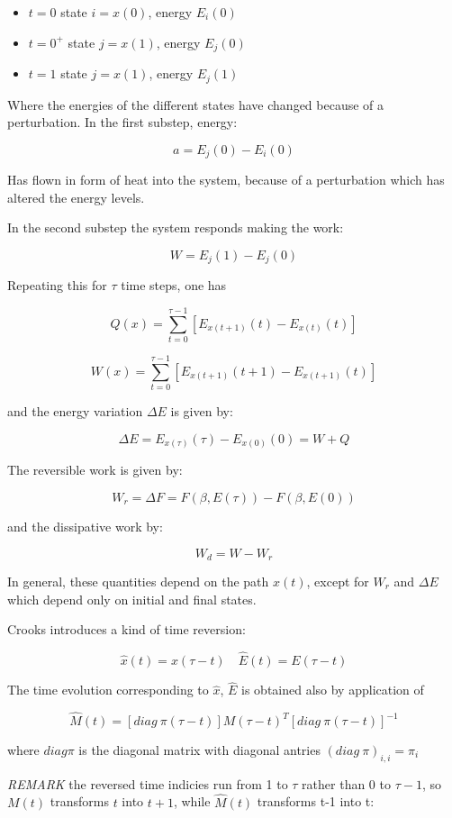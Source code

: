 \documentclass{article}
\begin{document}
\begin{itemize}
	\item $t=0$ state $i=x(0)$, energy $E_i(0)$
	\item $t=0^+$ state $j=x(1)$, energy $E_j(0)$
	\item $t=1$ state $j=x(1)$, energy $E_j(1)$
\end{itemize}

Where the energies of the different states have changed because of a perturbation.
In the first substep, energy: 

$$ a = E_j(0)-E_i(0)$$

Has flown in form of heat into the system, because of a perturbation which has altered the energy levels.

In the second substep the system responds making the work:

$$ W = E_j(1) - E_j(0)$$

Repeating this for $\tau$ time steps, one has

$$Q(x) = \sum_{t=0}^{\tau -1}[E_{x(t+1)}(t) - E_{x(t)}(t)]$$

$$W(x) = \sum_{t=0}^{\tau -1}[E_{x(t+1)}(t+1) - E_{x(t+1)}(t)]$$

and the energy variation $\Delta E$ is given by:

$$\Delta E = E_{x(\tau)}(\tau) - E_{x(0)}(0) = W + Q $$

The reversible work is given by:

$$W_r = \Delta F = F(\beta,E(\tau)) - F(\beta,E(0))$$

and the dissipative work by:

$$ W_d = W - W_r $$

In general, these quantities depend on the path $x(t)$, except for $W_r$ and $\Delta E$ which depend only on initial and final states.

Crooks introduces a kind of time reversion:

$$\hat{x}(t) = x(\tau - t) \quad \hat{E}(t) = E(\tau - t)$$

The time evolution corresponding to $\hat{x}$, $\hat{E}$ is obtained also by application of

$$\hat{M}(t) = [diag \ \pi(\tau-t)] M(\tau-t)^T [diag \ \pi(\tau-t)]^{-1}$$

where $diag \pi$ is the diagonal matrix with diagonal antries $(diag \ \pi)_{i,i} = \pi_i$

\emph{REMARK} the reversed time indicies run from 1 to $\tau$ rather than 0 to $\tau-1$, so $M(t)$ transforms $t$ into $t+1$, while $\hat{M}(t)$ transforms t-1 into t:
\end{document}
